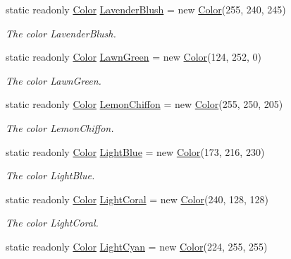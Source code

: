 \begin{DoxyCompactItemize}
static readonly \hyperlink{struct_tri_devs_1_1_tri_engine_1_1_color}{Color} \hyperlink{struct_tri_devs_1_1_tri_engine_1_1_color_acb7e8823330b555d6fe14fff0487d960}{Lavender\-Blush} = new \hyperlink{struct_tri_devs_1_1_tri_engine_1_1_color}{Color}(255, 240, 245)
\begin{DoxyCompactList}\small\item\em The color Lavender\-Blush. \end{DoxyCompactList}\item 
static readonly \hyperlink{struct_tri_devs_1_1_tri_engine_1_1_color}{Color} \hyperlink{struct_tri_devs_1_1_tri_engine_1_1_color_ab034b011554dceb711e464506be9f0d2}{Lawn\-Green} = new \hyperlink{struct_tri_devs_1_1_tri_engine_1_1_color}{Color}(124, 252, 0)
\begin{DoxyCompactList}\small\item\em The color Lawn\-Green. \end{DoxyCompactList}\item 
static readonly \hyperlink{struct_tri_devs_1_1_tri_engine_1_1_color}{Color} \hyperlink{struct_tri_devs_1_1_tri_engine_1_1_color_a01dbe75f5995709f69132aa49b792426}{Lemon\-Chiffon} = new \hyperlink{struct_tri_devs_1_1_tri_engine_1_1_color}{Color}(255, 250, 205)
\begin{DoxyCompactList}\small\item\em The color Lemon\-Chiffon. \end{DoxyCompactList}\item 
static readonly \hyperlink{struct_tri_devs_1_1_tri_engine_1_1_color}{Color} \hyperlink{struct_tri_devs_1_1_tri_engine_1_1_color_a74181545b6ec10be3cdf48083f32e04e}{Light\-Blue} = new \hyperlink{struct_tri_devs_1_1_tri_engine_1_1_color}{Color}(173, 216, 230)
\begin{DoxyCompactList}\small\item\em The color Light\-Blue. \end{DoxyCompactList}\item 
static readonly \hyperlink{struct_tri_devs_1_1_tri_engine_1_1_color}{Color} \hyperlink{struct_tri_devs_1_1_tri_engine_1_1_color_abef0e2d9a436f1f41f32835f1cb6a5c1}{Light\-Coral} = new \hyperlink{struct_tri_devs_1_1_tri_engine_1_1_color}{Color}(240, 128, 128)
\begin{DoxyCompactList}\small\item\em The color Light\-Coral. \end{DoxyCompactList}\item 
static readonly \hyperlink{struct_tri_devs_1_1_tri_engine_1_1_color}{Color} \hyperlink{struct_tri_devs_1_1_tri_engine_1_1_color_acb264746ac5a5eed0a561f2049135cb8}{Light\-Cyan} = new \hyperlink{struct_tri_devs_1_1_tri_engine_1_1_color}{Color}(224, 255, 255)

\end{DoxyCompactItemize}
